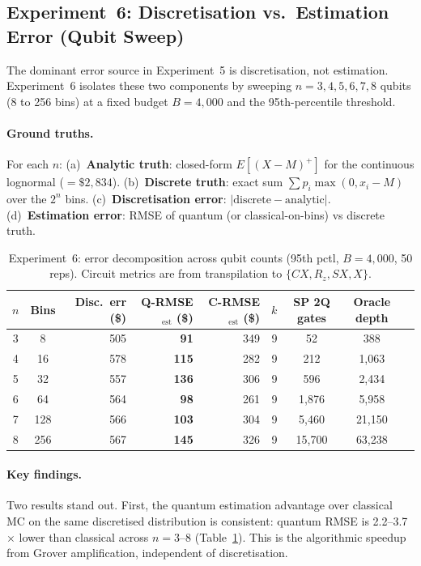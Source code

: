 \documentclass[11pt,a4paper]{article}
\begin{document}
\subsection{Experiment~6: Discretisation vs.\ Estimation Error (Qubit Sweep)}

The dominant error source in Experiment~5 is discretisation, not estimation. Experiment~6 isolates these two components by sweeping $n = 3, 4, 5, 6, 7, 8$ qubits (8 to 256 bins) at a fixed budget $B = 4{,}000$ and the 95th-percentile threshold.

\paragraph{Ground truths.} For each $n$: (a)~\textbf{Analytic truth}: closed-form $E[(X-M)^+]$ for the continuous lognormal ($= \$2{,}834$). (b)~\textbf{Discrete truth}: exact sum $\sum p_i \max(0, x_i - M)$ over the $2^n$ bins. (c)~\textbf{Discretisation error}: $|\text{discrete} - \text{analytic}|$. (d)~\textbf{Estimation error}: RMSE of quantum (or classical-on-bins) vs discrete truth.

\begin{table}[t]
\centering
\caption{Experiment~6: error decomposition across qubit counts (95th pctl, $B = 4{,}000$, 50 reps). Circuit metrics are from transpilation to $\{CX, R_z, SX, X\}$.}
\label{tab:circuit_resources}
\begin{tabular}{ccrrrrccc}
\toprule
$n$ & Bins & Disc.\ err (\$) & Q-RMSE$_{\text{est}}$ (\$) & C-RMSE$_{\text{est}}$ (\$) & $k$ & SP 2Q gates & Oracle depth \\
\midrule
3 & 8 & 505 & \textbf{91} & 349 & 9 & 52 & 388 \\
4 & 16 & 578 & \textbf{115} & 282 & 9 & 212 & 1,063 \\
5 & 32 & 557 & \textbf{136} & 306 & 9 & 596 & 2,434 \\
6 & 64 & 564 & \textbf{98} & 261 & 9 & 1,876 & 5,958 \\
7 & 128 & 566 & \textbf{103} & 304 & 9 & 5,460 & 21,150 \\
8 & 256 & 567 & \textbf{145} & 326 & 9 & 15,700 & 63,238 \\
\bottomrule
\end{tabular}
\end{table}

\paragraph{Key findings.} Two results stand out. First, the quantum estimation advantage over classical MC on the same discretised distribution is consistent: quantum RMSE is 2.2--3.7$\times$ lower than classical across $n=3$--$8$ (Table~\ref{tab:circuit_resources}). This is the algorithmic speedup from Grover amplification, independent of discretisation.
\end{document}
